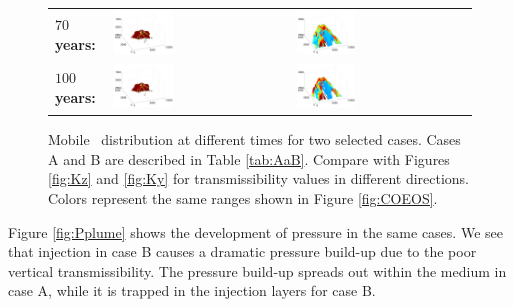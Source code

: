 \begin{figure}
\begin{tabular}{MMM}
\textbf{$70$ years:}&
\includegraphics[width=0.35\textwidth]{./figurer/C02222c70_pers}&
\includegraphics[width=0.35\textwidth]{./figurer/C03211c70_pers}\\
\textbf{$100$ years:}&
\includegraphics[width=0.35\textwidth]{./figurer/C02222c100_pers}&
\includegraphics[width=0.35\textwidth]{./figurer/C03211c100_pers}\\
\end{tabular}
\caption{Mobile \coo\ distribution at different times for two selected cases. Cases A and B are described in Table \ref{tab:AaB}. Compare with Figures \ref{fig:Kz} and \ref{fig:Ky} for transmissibility values in different directions. Colors represent the same ranges shown in Figure \ref{fig:COEOS}.}
\label{fig:COplume}
\end{figure}

Figure \ref{fig:Pplume} shows the development of pressure in the same cases. We see that injection in case B causes a dramatic pressure build-up due to the poor vertical transmissibility. The pressure build-up spreads out within the medium in case A, while it is trapped in the injection layers for case B.

